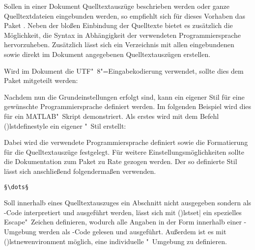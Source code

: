 \documentclass[%
  english,ngerman,%
  cdgeometry=no,DIV=12,%
  cd=false,cdfont=false,cdtitle=true,%
  headings=normal,%
  automark,%
  listof=toc,%
]{tudscrartcl}
\begin{document}
Sollen in einer Dokument Quelltextauszüge beschrieben werden oder ganze 
Quelltextdateien eingebunden werden, so empfiehlt sich für dieses Vorhaben das 
Paket . Neben der bloßen Einbindung der Quelltexte bietet es 
zusätzlich die Möglichkeit, die Syntax in Abhängigkeit der verwendeten 
Programmiersprache hervorzuheben. Zusätzlich lässt sich ein Verzeichnis mit 
allen eingebundenen sowie direkt im Dokument angegebenen Quelltextauszügen 
erstellen.
%
\begin{Hint}
\usepackage{listings}
\end{Hint}
%
Wird im Dokument die UTF"~8"=Eingabekodierung verwendet, sollte dies dem Paket 
mitgeteilt werden:
%
\begin{Hint}
\end{Hint}
%
Nachdem nun die Grundeinstellungen erfolgt sind, kann ein eigener Stil für eine 
gewünschte Programmiersprache definiert werden. Im folgenden Beispiel wird dies 
für ein MATLAB"~Skript demonstriert. Als erstes wird mit dem Befehl 
\Macro(){lstdefinestyle} ein eigener "~Stil 
erstellt:
%
\begin{Hint*}
\end{Hint*}
%
Dabei wird die verwendete Programmiersprache definiert sowie die Formatierung 
für die Quelltextauszüge festgelegt. Für weitere Einstellungsmöglichkeiten 
sollte die Dokumentation zum Paket zu Rate gezogen werden. Der so definierte 
Stil lässt sich anschließend folgendermaßen verwenden.
%
\begin{Hint}
\begin{lstlisting}[style=matlab]
§\dots§
\end{lstlisting}
\end{Hint}
%
Soll innerhalb eines Quelltextauszuges ein Abschnitt nicht ausgegeben sondern 
als -Code interpretiert und ausgeführt werden, lässt sich mit 
\Macro(){lstset|}
ein spezielles Escape"~Zeichen definieren, wodurch alle Angaben in der Form 
\PValue{\dots} innerhalb einer 
-Umgebung werden als -Code gelesen und 
ausgeführt. Außerdem ist es mit \Macro(){lstnewenvironment} 
möglich, eine individuelle "~Umgebung zu definieren.
\end{document}

